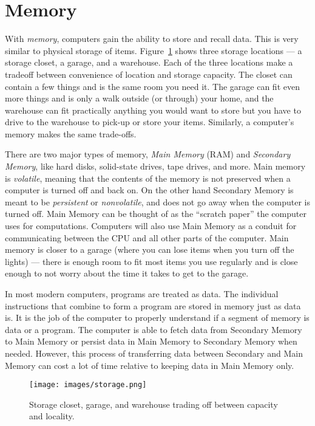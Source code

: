 \section{Memory}

With \emph{memory}, computers gain the ability to store and recall data. This is very
similar to physical storage of items. Figure~\ref{fig:hardware:storage} shows
three storage locations --- a storage closet, a garage, and a warehouse. Each of
the three locations make a tradeoff between convenience of location and storage
capacity. The closet can contain a few things and is the same room you need it.
The garage can fit even more things and is only a walk outside (or through) your
home, and the warehouse can fit practically anything you would want to store but
you have to drive to the warehouse to pick-up or store your items. Similarly, a
computer's memory makes the same trade-offs.

There are two major types of memory, \emph{Main Memory} (RAM) and \emph{Secondary Memory},
like hard disks, solid-state drives, tape drives, and more. Main memory is \emph{volatile},
meaning that the contents of the memory is not preserved when a computer is
turned off and back on. On the other hand Secondary Memory is meant to be
\emph{persistent} or \emph{nonvolatile}, and does not go away when the computer is turned off. Main Memory
can be thought of as the ``scratch paper'' the computer uses for computations.
Computers will also use Main Memory as a conduit for communicating between the
CPU and all other parts of the computer. Main memory is closer to a garage
(where you can lose items when you turn off the lights) --- there is enough room
to fit most items you use regularly and is close enough to not worry about the
time it takes to get to the garage.

In most modern computers,
programs are treated as data. The individual instructions that combine
to form a program are stored in memory just as data is. It is the job of the
computer to properly understand if a segment of memory is data or a program.
The computer is able to fetch data from Secondary Memory to Main Memory or
persist data in Main Memory to Secondary Memory when needed. However,
this process of transferring data between Secondary and Main Memory can
cost a lot of time relative to keeping data in Main Memory only.

\begin{figure}
	\centering
	\texttt{[image: images/storage.png]}
	\caption{Storage closet, garage, and warehouse trading off between
                 capacity and locality. }
	\label{fig:hardware:storage}
\end{figure}

